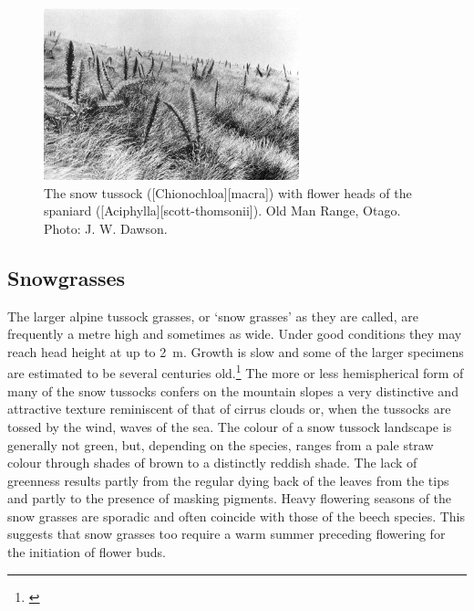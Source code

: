 \begin{figure}
	\includegraphics[width=0.66\textwidth]{graphics/figure96snow-tussock.jpg}
	\centering
	\caption[Snow tussock]{The snow tussock ([Chionochloa][macra]) with flower heads of the spaniard ([Aciphylla][scott-thomsonii]).
	Old Man Range, Otago.
	Photo: J. W. Dawson.}%
	\label{fig:96snow-tussock}
\end{figure}

\subsection{Snowgrasses}

The larger alpine tussock grasses, or `snow grasses' as they are called, are frequently a metre high and sometimes as wide.
Under good conditions they may reach head height at up to \SI{2}{\metre}.
Growth is slow and some of the larger specimens are estimated to be several centuries old.\footnote{\cite{mark1974snow}}
The more or less hemispherical form of many of the snow tussocks confers on the mountain slopes a very distinctive and attractive texture reminiscent of that of cirrus clouds or, when the tussocks are tossed by the wind, waves of the sea.
The colour of a snow tussock landscape is generally not green, but, depending on the species, ranges from a pale straw colour through shades of brown to a distinctly reddish shade.
The lack of greenness results partly from the regular dying back of the leaves from the tips and partly to the presence of masking pigments.
Heavy flowering seasons of the snow grasses are sporadic and often coincide with those of the beech species.
This suggests that snow grasses too require a warm summer preceding flowering for the initiation of flower buds.

